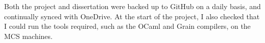 Both the project and dissertation were backed up to GitHub on a daily basis, and continually synced with OneDrive. At the start of the project, I also checked that I could run the tools required, such as the OCaml and Grain compilers, on the MCS machines. 





